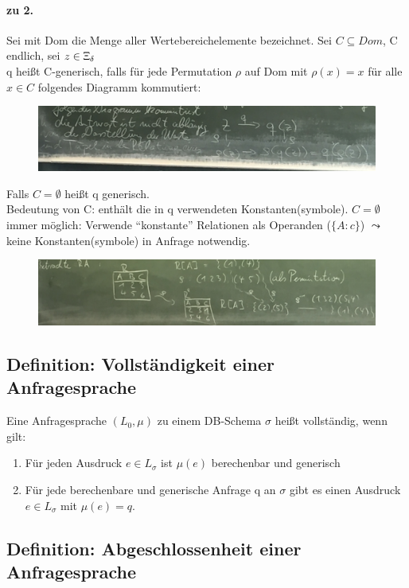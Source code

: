 \documentclass[12pt, a4paper]{article}
\begin{document}
\paragraph{zu 2.} Sei mit Dom die Menge aller Wertebereichelemente bezeichnet. Sei $C \subseteq Dom$, C endlich, sei $z \in \Upxi_\delta$ \\
q heißt C-generisch, falls für jede Permutation $\rho$ auf Dom mit $\rho(x) = x$ für alle $x \in C$ folgendes Diagramm kommutiert:
\begin{figure}
\centering
\includegraphics[width=0.7\linewidth]{img/img19}
\caption{}
\label{fig:img19}
\end{figure}

Falls $C = \emptyset$ heißt q generisch. \\
Bedeutung von C: enthält die in q verwendeten Konstanten(symbole). $C = \emptyset$ immer möglich: Verwende ``konstante'' Relationen als Operanden ($\{A : c \}$) $\leadsto$ keine Konstanten(symbole) in Anfrage notwendig.

\begin{figure}
\centering
\includegraphics[width=0.7\linewidth]{img/img20}
\caption{}
\label{fig:img20}
\end{figure}

\subsection*{Definition: Vollständigkeit einer Anfragesprache}

Eine Anfragesprache $(L_0, \mu)$ zu einem DB-Schema $\sigma$ heißt vollständig, wenn gilt: 
\begin{enumerate}
\item Für jeden Ausdruck $e \in L_\sigma$ ist $\mu(e)$ berechenbar und generisch
\item Für jede berechenbare und generische Anfrage q an $\sigma$ gibt es einen Ausdruck $e \in L_\sigma$ mit $\mu(e) = q$.
\end{enumerate}


\subsection*{Definition: Abgeschlossenheit einer Anfragesprache}
\end{document}
